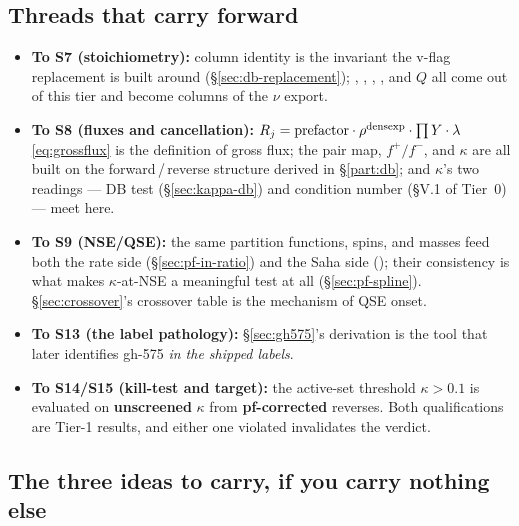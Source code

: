\subsection*{Threads that carry forward}

\begin{itemize}
\item \textbf{To S7 (stoichiometry):} column identity is the invariant the
      v-flag replacement is built around (\S\ref{sec:db-replacement});
      , , ,
      , and $Q$ all come out of this tier and become columns of
      the $\nu$ export.
\item \textbf{To S8 (fluxes and cancellation):}
      $R_j = \text{prefactor}\cdot\rho^{\rm densexp}\cdot\prod Y\cdot\lambda$
      \eqref{eq:grossflux} is the definition of gross flux; the pair map,
      $f^+/f^-$, and $\kappa$ are all built on the forward\,/\,reverse structure
      derived in \S\ref{part:db}; and $\kappa$'s two readings --- DB test
      (\S\ref{sec:kappa-db}) and condition number (\S V.1 of Tier~0) --- meet
      here.
\item \textbf{To S9 (NSE/QSE):} the same partition functions, spins, and masses
      feed both the rate side (\S\ref{sec:pf-in-ratio}) and the Saha side
      (); their consistency is what makes $\kappa$-at-NSE a
      meaningful test at all (\S\ref{sec:pf-spline}). \S\ref{sec:crossover}'s
      crossover table is the mechanism of QSE onset.
\item \textbf{To S13 (the label pathology):} \S\ref{sec:gh575}'s derivation is
      the tool that later identifies gh-575 \emph{in the shipped labels}.
\item \textbf{To S14/S15 (kill-test and target):} the active-set threshold
      $\kappa > 0.1$ is evaluated on \textbf{unscreened} $\kappa$ from
      \textbf{pf-corrected} reverses. Both qualifications are Tier-1 results,
      and either one violated invalidates the verdict.
\end{itemize}

\subsection*{The three ideas to carry, if you carry nothing else}


